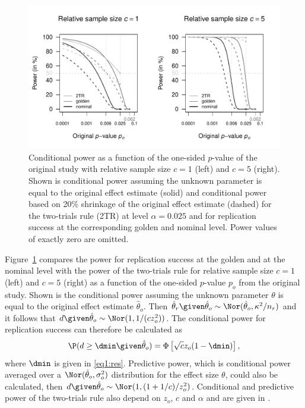 \begin{figure}[!ht]
\begin{center}
\begin{knitrout}
\color{fgcolor}

{\centering \includegraphics[width=\maxwidth]{images/paper1/fig3-1}

}

\end{knitrout}
\end{center}
\caption{Conditional power as a function of the {one-sided} $p$-value of the
  original study with relative sample size $c=1$ (left) and $c=5$ (right). Shown
  is conditional power assuming the unknown parameter is equal to the original
  effect estimate (solid) and conditional power based on 20\% shrinkage of the
  original effect estimate (dashed) for the two-trials rule (2TR) at level
  $\alpha = 0.025$ and for replication success at the corresponding golden and
  nominal level. Power values of exactly zero are omitted.}
\label{fig1:fig3}
\end{figure}

\sloppy
Figure~\ref{fig1:fig3} compares the power for replication success
\citep[see][Section 4 for details]{Held2020} at the golden and at the nominal
level with the power of the two-trials rule for relative sample size $c = 1$
(left) and $c = 5$ (right) as a function of the one-sided $p$-value $p_o$ from
the original study. Shown is the conditional power assuming the unknown
parameter $\theta$ is equal to the original effect estimate $\hat \theta_o$.
Then $\hat \theta_r \given \hat \theta_o \sim \Nor(\hat \theta_o, \kappa^2/n_r)$
and it follows that $d \given \hat \theta_o \sim \Nor(1, 1/(c z_o^2))$. The
conditional power for replication success can therefore be calculated as
\begin{equation}\label{eq1:condPower}
\P(d \geq \dmin \given \hat \theta_o) = \Phi\left[\sqrt{c} z_o (1-\dmin)\right],
\end{equation}
where $\dmin$ is given in \eqref{eq1:res}. Predictive power, which is
conditional power averaged over a \mbox{$\Nor(\hat \theta_o, \sigma_o^2)$}
distribution for the effect size $\theta$, could also be calculated, then
\mbox{$d \given \hat \theta_o \sim \Nor(1, (1+1/c)/z_o^2)$}. Conditional and
predictive power of the two-trials rule also depend on $z_o$, $c$ and $\alpha$
and are given in \citet{Micheloud2020}.

